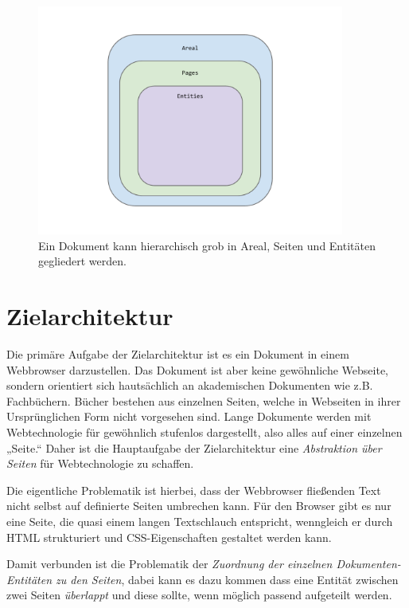 \begin{figure}[h!]
  \centering
    \includegraphics[width=0.9\textwidth]{figures/areal_pages_entities.pdf}
  \caption{Ein Dokument kann hierarchisch grob in Areal, Seiten und Entitäten gegliedert werden.}\label{fig-areal_pages_entities}
\end{figure}

\section{Zielarchitektur}\label{sec-zielarchitektur}

Die primäre Aufgabe der Zielarchitektur ist es ein Dokument in
einem Webbrowser darzustellen. Das Dokument ist aber keine gewöhnliche
Webseite, sondern orientiert sich hautsächlich an akademischen
Dokumenten wie z.B. Fachbüchern. Bücher bestehen aus einzelnen Seiten,
welche in Webseiten in ihrer Ursprünglichen Form nicht vorgesehen sind.
Lange Dokumente werden mit Webtechnologie für gewöhnlich stufenlos
dargestellt, also alles auf einer einzelnen „Seite.“
Daher ist die Hauptaufgabe der Zielarchitektur eine \emph{Abstraktion
über Seiten} für Webtechnologie zu schaffen.

Die eigentliche Problematik ist hierbei, dass der Webbrowser fließenden
Text nicht selbst auf definierte Seiten umbrechen kann. Für den Browser
gibt es nur eine Seite, die quasi einem langen Textschlauch entspricht,
wenngleich er durch HTML strukturiert und
CSS-Eigenschaften gestaltet werden kann.

Damit verbunden ist die Problematik der
\emph{Zuordnung der einzelnen Dokumenten-Entitäten zu den Seiten},
dabei kann es dazu kommen dass eine Entität zwischen zwei Seiten
\emph{überlappt} und diese sollte, wenn möglich passend aufgeteilt werden.

